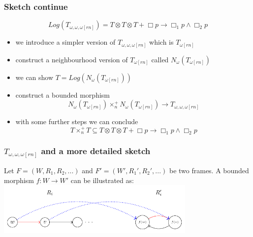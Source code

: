 \documentclass[hyperref={pdfpagelabels=false},t,10pt]{beamer}
\begin{document}
\begin{frame}
  \frametitle{Sketch continue}
  $$Log(T_{\omega,\omega,\omega[rn]}) = T \otimes T \otimes T+ \Box p \rightarrow \Box_1 p \land \Box_2 p$$
  \begin{itemize}
    \item we introduce a simpler version of $T_{\omega,\omega,\omega[rn]}$ which is $T_{\omega[rn]}$ \pause
    \item construct a neighbourhood version of $T_{\omega[rn]}$ called $N_\omega(T_{\omega[rn]})$ 
    \item we can show $T = Log(N_\omega(T_{\omega[rn]}))$ \pause
    \item construct a bounded morphism $$N_\omega(T_{\omega[rn]}) \times_n^+ N_\omega(T_{\omega[rn]}) \rightarrow T_{\omega,\omega,\omega[rn]}$$
    \item with some further steps we can conclude $$T \times_n^+ T \subseteq T \otimes T \otimes T + \Box p \rightarrow \Box_1 p \land \Box_2 p$$
  \end{itemize}

\end{frame}  

\begin{frame}
  \frametitle{$T_{\omega,\omega,\omega[rn]}$ and a more detailed sketch}
    Let $F = (W,R_1,R_2,...)$ and $F' = (W',R_1',R_2',...)$ be two frames. A bounded morphism $f: W \rightarrow W'$ can be illustrated as:
    \centering
    \includegraphics[width=0.73\textwidth]{Example8.pdf}

    \vspace{1cm}

\end{frame}
\end{document}

